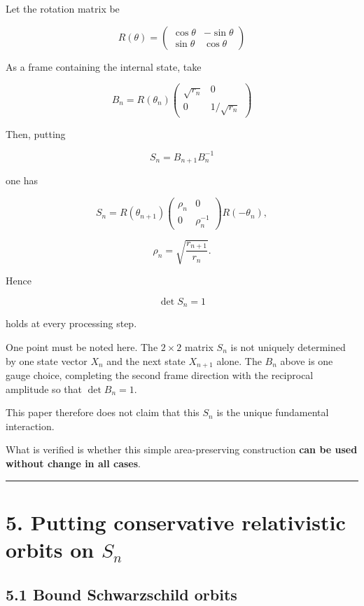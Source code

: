 \documentclass[
  a4paper,
]{article}
\begin{document}
Let the rotation matrix be

\[
R(\theta)=
\begin{pmatrix}
\cos\theta&-\sin\theta\\
\sin\theta&\cos\theta
\end{pmatrix}
\]

As a frame containing the internal state, take

\[
B_n
=
R(\theta_n)
\begin{pmatrix}
\sqrt{r_n}&0\\
0&1/\sqrt{r_n}
\end{pmatrix}
\]

Then, putting

\[
S_n=B_{n+1}B_n^{-1}
\]

one has

\[
S_n
=
R(\theta_{n+1})
\begin{pmatrix}
\rho_n&0\\
0&\rho_n^{-1}
\end{pmatrix}
R(-\theta_n),
\]

\[
\rho_n=
\sqrt{\frac{r_{n+1}}{r_n}}.
\]

Hence

\[
\boxed{\det S_n=1}
\]

holds at every processing step.

One point must be noted here. The \(2\times2\) matrix \(S_n\) is not
uniquely determined by one state vector \(X_n\) and the next state
\(X_{n+1}\) alone. The \(B_n\) above is one gauge choice, completing the
second frame direction with the reciprocal amplitude so that
\(\det B_n=1\).

This paper therefore does not claim that this \(S_n\) is the unique
fundamental interaction.

What is verified is whether this simple area-preserving construction
\textbf{can be used without change in all cases}.

\begin{center}\rule{0.5\linewidth}{0.5pt}\end{center}

\section{\texorpdfstring{5. Putting conservative relativistic orbits on
\(S_n\)}{5. Putting conservative relativistic orbits on S\_n}}\label{putting-conservative-relativistic-orbits-on-s_n}

\subsection{5.1 Bound Schwarzschild
orbits}\label{bound-schwarzschild-orbits}
\end{document}
